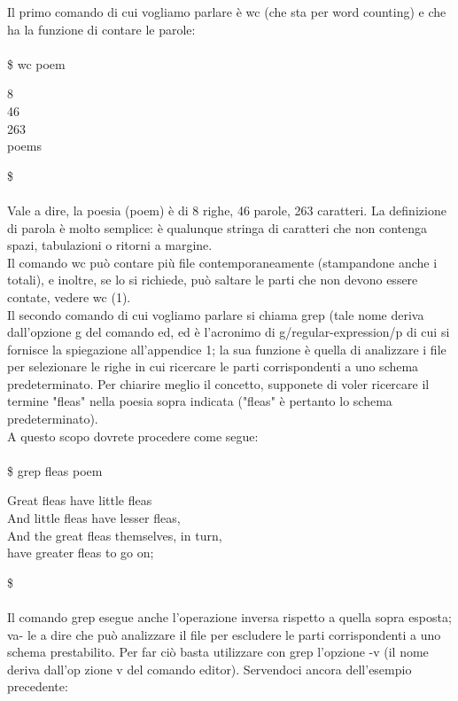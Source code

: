 Il primo comando di cui vogliamo parlare è wc (che sta per word counting) e che ha la
funzione di contare le parole:\\\\
\$ wc poem
\begin{multicols}{4}
	8 \\ 46\\ 263\\ poems
\end{multicols}
\$\\\\
Vale a dire, la poesia (poem) è di 8 righe, 46 parole, 263 caratteri. La definizione di
parola è molto semplice: è qualunque stringa di caratteri che non contenga spazi, 
tabulazioni o ritorni a margine.\\
Il comando wc può contare più file contemporaneamente (stampandone anche i totali),
e inoltre, se lo si richiede, può saltare le parti che non devono essere contate, vedere
wc (1).\\
Il secondo comando di cui vogliamo parlare si chiama grep (tale nome deriva
dall'opzione g del comando ed, ed è l'acronimo di g/regular-expression/p di cui si
fornisce la spiegazione all'appendice 1; la sua funzione è quella di analizzare i file per
selezionare le righe in cui ricercare le parti corrispondenti a uno schema predeterminato.
Per chiarire meglio il concetto, supponete di voler ricercare il termine "fleas"
nella poesia sopra indicata ("fleas" è pertanto lo schema predeterminato).\\
A questo scopo dovrete procedere come segue:\\\\
\$ grep fleas poem
\begin{center}
	Great fleas have little fleas\\
	And little fleas have lesser fleas,\\
	And the great fleas themselves, in turn,\\
	have greater fleas to go on;	\\
\end{center}
\$\\\\
Il comando grep esegue anche l'operazione inversa rispetto a quella sopra esposta; va-
le a dire che può analizzare il file per escludere le parti corrispondenti a uno schema
prestabilito. Per far ciò basta utilizzare con grep l'opzione -v (il nome deriva dall'op
zione v del comando editor). Servendoci ancora dell'esempio precedente: